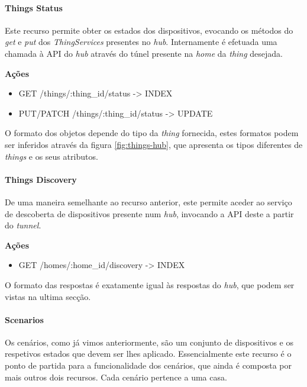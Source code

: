 \paragraph*{Things Status}

Este recurso permite obter os estados dos dispositivos, evocando os métodos do \textit{get} e \textit{put} dos \textit{ThingServices} presentes no \textit{hub}. Internamente é efetuada uma chamada à API do \textit{hub} através do túnel presente na \textit{home} da \textit{thing} desejada.

\textbf{Ações}
\begin{itemize}
    \item GET /things/:thing{\_}id/status -> INDEX
    \item PUT/PATCH /things/:thing{\_}id/status -> UPDATE
\end{itemize}

O formato dos objetos depende do tipo da \textit{thing} fornecida, estes formatos podem ser inferidos através da figura \ref{fig:things-hub}, que apresenta os tipos diferentes de \textit{things} e os seus atributos.

\paragraph*{Things Discovery}

De uma maneira semelhante ao recurso anterior, este permite aceder ao serviço de descoberta de dispositivos presente num \textit{hub}, invocando a API deste a partir do \textit{tunnel}.

\textbf{Ações}
\begin{itemize}
    \item GET /homes/:home{\_}id/discovery -> INDEX
\end{itemize}

O formato das respostas é exatamente igual às respostas do \textit{hub}, que podem ser vistas na ultima secção.


\paragraph*{Scenarios}

Os cenários, como já vimos anteriormente, são um conjunto de dispositivos e os respetivos estados que devem ser lhes aplicado. Essencialmente este recurso é o ponto de partida para a funcionalidade dos cenários, que ainda é composta por mais outros dois recursos. Cada cenário pertence a uma casa.

